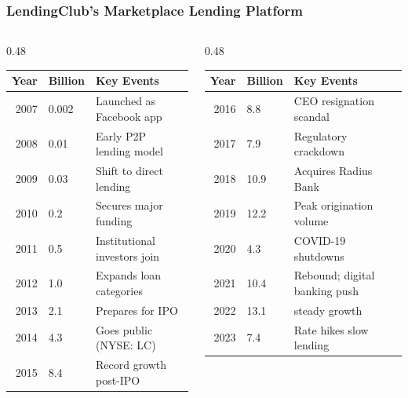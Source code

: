 \documentclass[aspectratio=169]{beamer}
\begin{document}
\begin{frame}
\frametitle{LendingClub's Marketplace Lending Platform}


\footnotesize
\begin{columns}[T]
    \begin{column}{0.48\textwidth}
        \begin{tabular}{rlp{3.5cm}}
            \toprule
            \textbf{Year} & \textbf{Billion} & \textbf{Key Events} \\
            \midrule
            2007 & 0.002 & Launched as Facebook app \\
            2008 & 0.01 & Early P2P lending model \\
            2009 & 0.03 & Shift to direct lending \\
            2010 & 0.2 & Secures major funding \\
            2011 & 0.5 & Institutional investors join \\
            2012 & 1.0 & Expands loan categories \\
            2013 & 2.1 & Prepares for IPO \\
            2014 & 4.3 & Goes public (NYSE: LC) \\
            2015 & 8.4 & Record growth post-IPO \\
            \bottomrule
        \end{tabular}
    \end{column}

    \begin{column}{0.48\textwidth}
        \begin{tabular}{rlp{3.5cm}}
            \toprule
            \textbf{Year} & \textbf{Billion} & \textbf{Key Events} \\
            \midrule
            2016 & 8.8 & CEO resignation scandal \\
            2017 & 7.9 & Regulatory crackdown \\
            2018 & 10.9 & Acquires Radius Bank \\
            2019 & 12.2 & Peak origination volume \\
            2020 & 4.3 & COVID-19 shutdowns \\
            2021 & 10.4 & Rebound; digital banking push \\
            2022 & 13.1 & steady growth \\
            2023 & 7.4 & Rate hikes slow lending \\
            \bottomrule
        \end{tabular}
    \end{column}
\end{columns}




\end{frame} 
\end{document}
